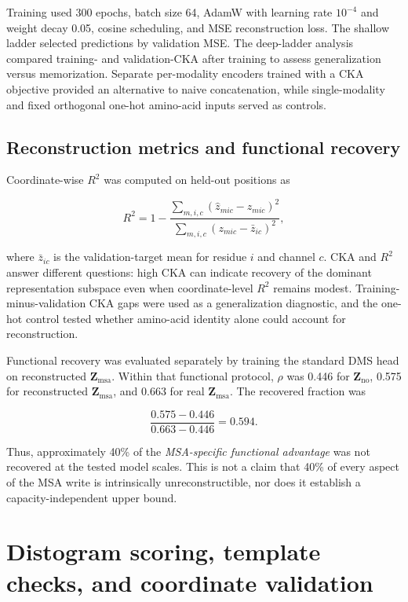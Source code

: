 \documentclass[10pt,a4paper]{article}
\newcommand{\Zno}{\mathbf{Z}_{\mathrm{no}}}
\newcommand{\Zmsa}{\mathbf{Z}_{\mathrm{msa}}}
\begin{document}
Training used 300 epochs, batch size 64, AdamW with learning rate $10^{-4}$ and weight decay 0.05, cosine scheduling, and MSE reconstruction loss. The shallow ladder selected predictions by validation MSE. The deep-ladder analysis compared training- and validation-CKA after training to assess generalization versus memorization. Separate per-modality encoders trained with a CKA objective provided an alternative to naive concatenation, while single-modality and fixed orthogonal one-hot amino-acid inputs served as controls.

\subsection{Reconstruction metrics and functional recovery}

Coordinate-wise $R^2$ was computed on held-out positions as

\begin{equation}
R^2=1-\frac{\sum_{m,i,c}(\hat z_{mic}-z_{mic})^2}
{\sum_{m,i,c}(z_{mic}-\bar z_{ic})^2},
\end{equation}

where $\bar z_{ic}$ is the validation-target mean for residue $i$ and channel $c$. CKA and $R^2$ answer different questions: high CKA can indicate recovery of the dominant representation subspace even when coordinate-level $R^2$ remains modest. Training-minus-validation CKA gaps were used as a generalization diagnostic, and the one-hot control tested whether amino-acid identity alone could account for reconstruction.

Functional recovery was evaluated separately by training the standard DMS head on reconstructed $\Zmsa$. Within that functional protocol, $\rho$ was 0.446 for $\Zno$, 0.575 for reconstructed $\Zmsa$, and 0.663 for real $\Zmsa$. The recovered fraction was

\begin{equation}
\frac{0.575-0.446}{0.663-0.446}=0.594.
\end{equation}

Thus, approximately 40\% of the \emph{MSA-specific functional advantage} was not recovered at the tested model scales. This is not a claim that 40\% of every aspect of the MSA write is intrinsically unreconstructible, nor does it establish a capacity-independent upper bound.

\section{Distogram scoring, template checks, and coordinate validation}
\end{document}
